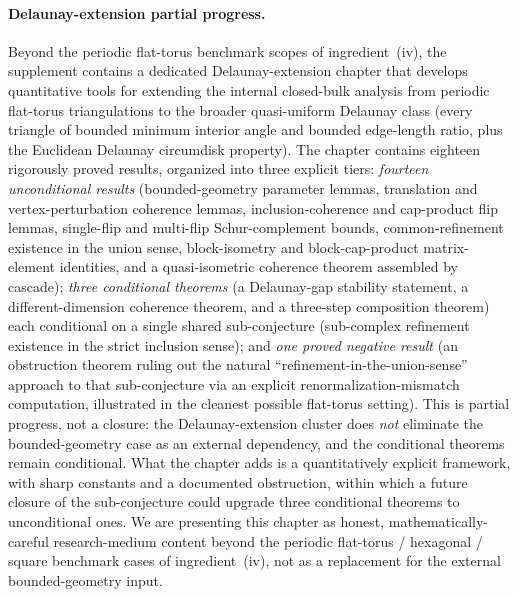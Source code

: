 \documentclass[11pt]{article}
\begin{document}
\paragraph{Delaunay-extension partial progress.}
Beyond the periodic flat-torus benchmark scopes of ingredient~(iv), the
supplement contains a dedicated Delaunay-extension chapter that develops
quantitative tools for extending the internal closed-bulk analysis from
periodic flat-torus triangulations to the broader quasi-uniform Delaunay
class (every triangle of bounded minimum interior angle and bounded
edge-length ratio, plus the Euclidean Delaunay circumdisk property). The
chapter contains eighteen rigorously proved results, organized into three
explicit tiers: \emph{fourteen unconditional results} (bounded-geometry
parameter lemmas, translation and vertex-perturbation coherence lemmas,
inclusion-coherence and cap-product flip lemmas, single-flip and multi-flip
Schur-complement bounds, common-refinement existence in the union sense,
block-isometry and block-cap-product matrix-element identities, and a
quasi-isometric coherence theorem assembled by cascade); \emph{three
conditional theorems} (a Delaunay-gap stability statement, a
different-dimension coherence theorem, and a three-step composition
theorem) each conditional on a single shared sub-conjecture
(sub-complex refinement existence in the strict inclusion sense); and
\emph{one proved negative result} (an obstruction theorem ruling out the
natural ``refinement-in-the-union-sense'' approach to that sub-conjecture
via an explicit renormalization-mismatch computation, illustrated in the
cleanest possible flat-torus setting). This is partial progress, not a
closure: the Delaunay-extension cluster does \emph{not} eliminate the
bounded-geometry case as an external dependency, and the conditional
theorems remain conditional. What the chapter adds is a quantitatively
explicit framework, with sharp constants and a documented obstruction,
within which a future closure of the sub-conjecture could upgrade three
conditional theorems to unconditional ones. We are presenting this
chapter as honest, mathematically-careful research-medium content
beyond the periodic flat-torus / hexagonal / square benchmark cases of
ingredient~(iv), not as a replacement for the external
bounded-geometry input.
\end{document}
